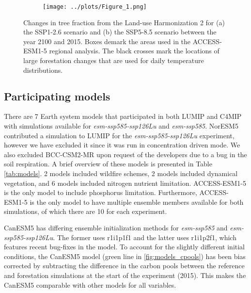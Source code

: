 \documentclass[]{article}
\begin{document}
\begin{figure}[H]
    \centering
    \begin{subfigure}[b]{\linewidth}
        \texttt{[image: ../plots/Figure\_1.png]}
    \end{subfigure}
    \caption{Changes in tree fraction from the Land-use Harmonization 2 for (a) the SSP1-2.6 scenario and (b) the SSP5-8.5 scenario between the year 2100 and 2015. Boxes demark the areas used in the ACCESS-ESM1-5 regional analysis. The black crosses mark the locations of large forestation changes that are used for daily temperature distributions.}
    \label{fig:land_use}
\end{figure}

\subsection{Participating models}

There are 7 Earth system models that participated in both LUMIP and C4MIP with simulations available for \textit{esm-ssp585-ssp126Lu} and \textit{esm-ssp585}.
NorESM5 contributed a simulation to LUMIP for the \textit{esm-ssp585-ssp126Lu} experiment, however we have excluded it since it was run in concentration driven mode.
We also excluded BCC-CSM2-MR upon request of the developers due to a bug in the soil respiration.
A brief overview of these models is presented in Table \ref{tab:models}.
2 models included wildfire schemes, 2 models included dynamical vegetation, and 6 models included nitrogen nutrient limitation.
ACCESS-ESM1-5 is the only model to include phosphorus limitation.
Furthermore, ACCESS-ESM1-5 is the only model to have multiple ensemble members available for both simulations, of which there are 10 for each experiment.

CanESM5 has differing ensemble initialization methods for \textit{esm-ssp585} and \textit{esm-ssp585-ssp126Lu}.
The former uses r1i1p1f1 and the latter uses r1i1p2f1, which features recent bug-fixes in the model.
To account for the slightly different initial conditions, the CanESM5 model (green line in \ref{fig:models_cpools}) has been bias corrected by subtracting the difference in the carbon pools between the reference and forestation simulations at the start of the experiment (2015).
This makes the CanESM5 comparable with other models for all variables.
\end{document}

